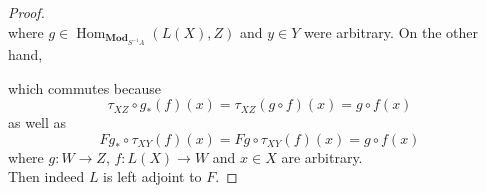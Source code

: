 \documentclass{article}
\newcommand{\Mod}{\mathbf{Mod}} %
\DeclareMathOperator{\Hom}{\mathrm{Hom}}
\begin{document}
\begin{proof}
\[    \]
    where $g\in \Hom_{\Mod_{S^{-1}A}}(L(X),Z)$ and $y\in Y$ were arbitrary. On the other hand,
    \begin{center}
    \end{center}
    which commutes because
    \[
    \tau_{XZ}\circ g_*(f)(x)=\tau_{XZ}(g\circ f)(x)=g\circ f(x)
    \]
    as well as
    \[
    Fg_*\circ \tau_{XY}(f)(x)=Fg\circ \tau_{XY}(f)(x)=g\circ f(x)
    \]
    where $g:W\to Z$, $f:L(X)\to W$ and $x\in X$ are arbitrary.\\
    Then indeed $L$ is left adjoint to $F$.
\end{proof}
\subsection{}
\end{document}
